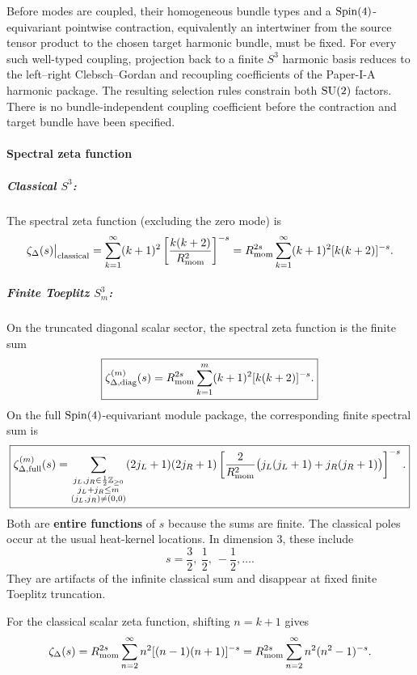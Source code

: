 \documentclass[12pt,a4paper]{article}
\begin{document}
\begin{remark}
Before modes are coupled, their homogeneous bundle types and a
\(\mathrm{Spin}(4)\)-equivariant pointwise contraction, equivalently an intertwiner
from the source tensor product to the chosen target harmonic bundle, must be
fixed.  For every such well-typed coupling, projection back to a finite
\(S^3\) harmonic basis reduces to the left--right Clebsch--Gordan and
recoupling coefficients of the Paper-I-A harmonic package.  The resulting
selection rules constrain both \(\mathrm{SU}(2)\) factors.  There is no
bundle-independent coupling coefficient before the contraction and target
bundle have been specified.
\end{remark}


\paragraph{Spectral zeta function}
\label{p2:sec:spectral-zeta}

\subparagraph{\texorpdfstring{Classical $S^3$:}{Classical S^3:}}
The spectral zeta function (excluding the zero mode) is
\[
\zeta_\Delta(s)\big|_{\text{classical}}
= \sum_{k=1}^{\infty} (k+1)^2 \left[\frac{k(k+2)}{R_{\mathrm{mom}}^2}\right]^{-s}
= R_{\mathrm{mom}}^{2s} \sum_{k=1}^{\infty} (k+1)^2 [k(k+2)]^{-s}.
\]

\subparagraph{\texorpdfstring{Finite Toeplitz $S^3_m$:}{Finite Toeplitz S^3_m:}}
On the truncated diagonal scalar sector, the spectral zeta function is the finite sum
\[
\boxed{
\zeta_{\Delta,\mathrm{diag}}^{(m)}(s)
= R_{\mathrm{mom}}^{2s}\sum_{k=1}^{m}(k+1)^2[k(k+2)]^{-s}.
}
\]
On the full \(\mathrm{Spin}(4)\)-equivariant module package, the corresponding finite spectral sum is
\[
\boxed{
\zeta_{\Delta,\mathrm{full}}^{(m)}(s)
=
\sum_{\substack{j_L,j_R\in\frac12\mathbb{Z}_{\ge0}\\j_L+j_R\le m\\(j_L,j_R)\ne(0,0)}}
(2j_L+1)(2j_R+1)
\left[
\frac{2}{R_{\mathrm{mom}}^2}
\bigl(j_L(j_L+1)+j_R(j_R+1)\bigr)
\right]^{-s}.
}
\]
Both are \textbf{entire functions} of \(s\) because the sums are finite.  The
classical poles occur at the usual heat-kernel locations.  In dimension \(3\),
these include
\[
  s=\frac32,\ \frac12,\ -\frac12,\ldots.
\]
They are artifacts of the infinite classical sum and disappear at fixed finite Toeplitz
truncation.

For the classical scalar zeta function, shifting \(n=k+1\) gives
\[
\zeta_\Delta(s)
= R_{\mathrm{mom}}^{2s}\sum_{n=2}^{\infty} n^2[(n-1)(n+1)]^{-s}
= R_{\mathrm{mom}}^{2s}\sum_{n=2}^{\infty} n^2(n^2-1)^{-s}.
\]
\end{document}
